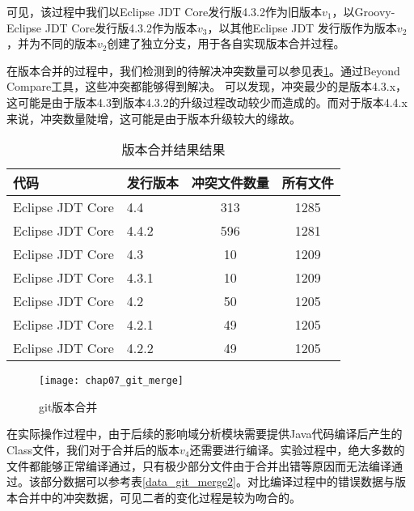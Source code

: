可见，该过程中我们以Eclipse JDT Core发行版4.3.2作为旧版本$v_1$，以Groovy-Eclipse JDT Core发行版4.3.2作为版本$v_3$，以其他Eclipse JDT 发行版作为版本$v_2$，并为不同的版本$v_2$创建了独立分支，用于各自实现版本合并过程。


在版本合并的过程中，我们检测到的待解决冲突数量可以参见表\ref {data_git_merge}。通过Beyond Compare工具，这些冲突都能够得到解决。
可以发现，冲突最少的是版本4.3.x，这可能是由于版本4.3到版本4.3.2的升级过程改动较少而造成的。而对于版本4.4.x来说，冲突数量陡增，这可能是由于版本升级较大的缘故。

\begin{table}
	\caption{版本合并结果结果}
	\label{data_git_merge}
	\centering
	\begin{tabular}{llcc}
		\toprule[1.5pt]
		{\heiti 代码} & {\heiti 发行版本} & {\heiti 冲突文件数量} & {\heiti 所有文件}\\\midrule[1pt]
		Eclipse JDT Core & 4.4 & 313 & 1285\\
		Eclipse JDT Core & 4.4.2 & 596 & 1281\\
		Eclipse JDT Core & 4.3 & 10 & 1209\\
		Eclipse JDT Core & 4.3.1 & 10 & 1209\\
		Eclipse JDT Core & 4.2 & 50 & 1205\\
		Eclipse JDT Core & 4.2.1 & 49 & 1205\\
		Eclipse JDT Core & 4.2.2 & 49 & 1205\\
		\bottomrule[1.5pt]
	\end{tabular}
\end{table}


\begin{figure}[H]
	\centering
	\texttt{[image: chap07\_git\_merge]}
	\caption {git版本合并}
	\label {exp_git_merge}	
\end{figure}

在实际操作过程中，由于后续的影响域分析模块需要提供Java代码编译后产生的Class文件，我们对于合并后的版本$v_4$还需要进行编译。实验过程中，绝大多数的文件都能够正常编译通过，只有极少部分文件由于合并出错等原因而无法编译通过。该部分数据可以参考表\ref {data_git_merge2}。对比编译过程中的错误数据与版本合并中的冲突数据，可见二者的变化过程是较为吻合的。

